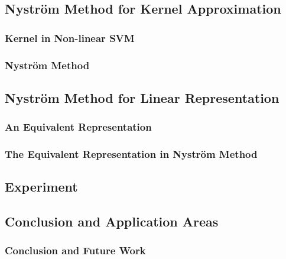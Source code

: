 \documentclass[14pt,xcolor=pstdvips]{beamer}
\begin{document}
\subsection{Nystr\"om Method for Kernel Approximation}
\begin{frame}
  \frametitle{Kernel in Non-linear SVM}
\end{frame}

\begin{frame}
  \frametitle{Nystr\"om Method}
\end{frame}

\subsection{Nystr\"om Method for Linear Representation}
\begin{frame}
  \frametitle{An Equivalent Representation}
\end{frame}

\begin{frame}
  \frametitle{The Equivalent Representation in Nystr\"om Method}
\end{frame}

\subsection{Experiment}

\subsection{Conclusion and Application Areas}
\begin{frame}
  \frametitle{Conclusion and Future Work}
\end{frame}
\end{document}

